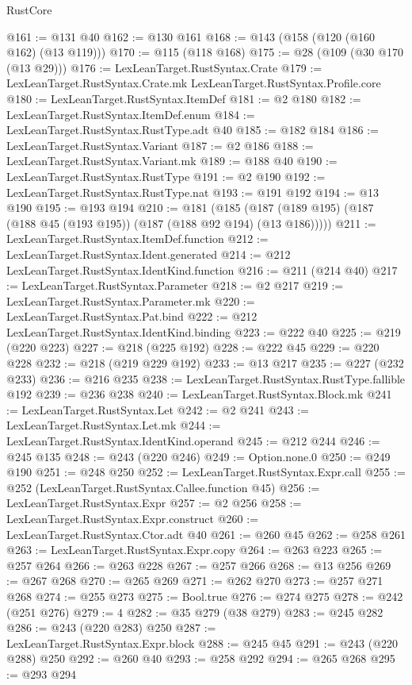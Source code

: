 \begin{lexlean}{RustCore}
\begin{coremodule}
@161 := @131 @40
@162 := @130 @161
@168 := @143 (@158 (@120 (@160 @162) (@13 @119)))
@170 := @115 (@118 @168)
@175 := @28 (@109 (@30 @170 (@13 @29)))
@176 := LexLeanTarget.RustSyntax.Crate
@179 := LexLeanTarget.RustSyntax.Crate.mk LexLeanTarget.RustSyntax.Profile.core
@180 := LexLeanTarget.RustSyntax.ItemDef
@181 := @2 @180
@182 := LexLeanTarget.RustSyntax.ItemDef.enum
@184 := LexLeanTarget.RustSyntax.RustType.adt @40
@185 := @182 @184
@186 := LexLeanTarget.RustSyntax.Variant
@187 := @2 @186
@188 := LexLeanTarget.RustSyntax.Variant.mk
@189 := @188 @40
@190 := LexLeanTarget.RustSyntax.RustType
@191 := @2 @190
@192 := LexLeanTarget.RustSyntax.RustType.nat
@193 := @191 @192
@194 := @13 @190
@195 := @193 @194
@210 := @181
    (@185 (@187 (@189 @195) (@187 (@188 @45 (@193 @195)) (@187 (@188 @92 @194) (@13 @186)))))
@211 := LexLeanTarget.RustSyntax.ItemDef.function
@212 := LexLeanTarget.RustSyntax.Ident.generated
@214 := @212 LexLeanTarget.RustSyntax.IdentKind.function
@216 := @211 (@214 @40)
@217 := LexLeanTarget.RustSyntax.Parameter
@218 := @2 @217
@219 := LexLeanTarget.RustSyntax.Parameter.mk
@220 := LexLeanTarget.RustSyntax.Pat.bind
@222 := @212 LexLeanTarget.RustSyntax.IdentKind.binding
@223 := @222 @40
@225 := @219 (@220 @223)
@227 := @218 (@225 @192)
@228 := @222 @45
@229 := @220 @228
@232 := @218 (@219 @229 @192)
@233 := @13 @217
@235 := @227 (@232 @233)
@236 := @216 @235
@238 := LexLeanTarget.RustSyntax.RustType.fallible @192
@239 := @236 @238
@240 := LexLeanTarget.RustSyntax.Block.mk
@241 := LexLeanTarget.RustSyntax.Let
@242 := @2 @241
@243 := LexLeanTarget.RustSyntax.Let.mk
@244 := LexLeanTarget.RustSyntax.IdentKind.operand
@245 := @212 @244
@246 := @245 @135
@248 := @243 (@220 @246)
@249 := Option.none.{0}
@250 := @249 @190
@251 := @248 @250
@252 := LexLeanTarget.RustSyntax.Expr.call
@255 := @252 (LexLeanTarget.RustSyntax.Callee.function @45)
@256 := LexLeanTarget.RustSyntax.Expr
@257 := @2 @256
@258 := LexLeanTarget.RustSyntax.Expr.construct
@260 := LexLeanTarget.RustSyntax.Ctor.adt @40
@261 := @260 @45
@262 := @258 @261
@263 := LexLeanTarget.RustSyntax.Expr.copy
@264 := @263 @223
@265 := @257 @264
@266 := @263 @228
@267 := @257 @266
@268 := @13 @256
@269 := @267 @268
@270 := @265 @269
@271 := @262 @270
@273 := @257 @271 @268
@274 := @255 @273
@275 := Bool.true
@276 := @274 @275
@278 := @242 (@251 @276)
@279 := 4
@282 := @35 @279 (@38 @279)
@283 := @245 @282
@286 := @243 (@220 @283) @250
@287 := LexLeanTarget.RustSyntax.Expr.block
@288 := @245 @45
@291 := @243 (@220 @288) @250
@292 := @260 @40
@293 := @258 @292
@294 := @265 @268
@295 := @293 @294

\end{coremodule}
\end{lexlean}

